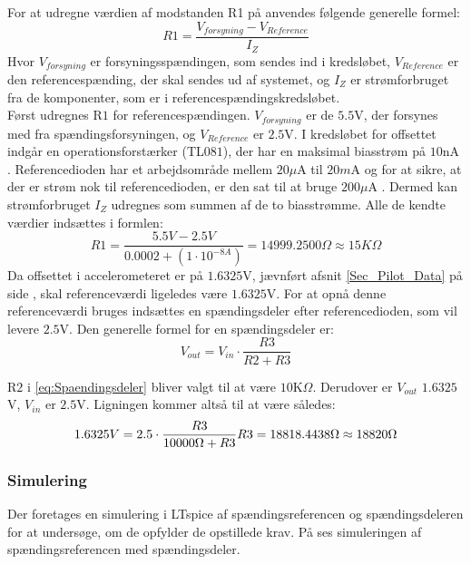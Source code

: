 \noindent For at udregne værdien af modstanden R1 på  anvendes følgende generelle formel:
\begin{equation}\label{eq:udregning_modstand}
R1 = \dfrac{V_{forsyning} - V_{Reference}}{I_{Z}}
\end{equation}
\noindent Hvor $V_{forsyning}$ er forsyningsspændingen, som sendes ind i kredsløbet, $V_{Reference}$ er den referencespænding, der skal sendes ud af systemet, og $I_{Z}$ er strømforbruget fra de komponenter, som er i referencespændingskredsløbet. \\
Først udregnes R$1$ for referencespændingen. $V_{forsyning}$ er de $5.5$V, der forsynes med fra spændingsforsyningen, og $V_{Reference}$ er $2.5$V. I kredsløbet for offsettet indgår en operationsforstærker (TL$081$), der har en maksimal biasstrøm på $10$nA \cite{Corporation1995}. Referencedioden har et arbejdsområde mellem $20\mu$A til $20m$A og for at sikre, at der er strøm nok til referencedioden, er den sat til at bruge $200\mu$A \cite{Instruments2005}. Dermed kan strømforbruget $I_{Z}$ udregnes som summen af de to biasstrømme. Alle de kendte værdier indsættes i formlen:
\begin{equation}
R1 = \frac{5.5V - 2.5V}{0.0002 + (1 \cdot 10^{-8A})} = 14999.2500\Omega \approx 15K\Omega
\end{equation}  
Da offsettet i accelerometeret er på $1.6325$V, jævnført afsnit \ref{Sec_Pilot_Data} på side \pageref{Sec_Pilot_Data}, skal referenceværdi ligeledes være $1.6325$V. For at opnå denne referenceværdi bruges indsættes en spændingsdeler efter referencedioden, som vil levere $2.5$V. Den generelle formel for en spændingsdeler er: 
\begin{equation} \label{eq:Spaendingsdeler}
V_{out} = V_{in} \cdot \dfrac{R3}{R2 + R3}
\end{equation}

R$2$ i \eqref{eq:Spaendingsdeler} bliver valgt til at være $10$K$\Omega$. Derudover er $V_{out}$ $1.6325$V, $V_{in}$ er $2.5$V. Ligningen kommer altså til at være således: 
\begin{equation}
1.6325V = 2.5 \cdot \dfrac{R3}{10000\Omega + R3} \\
R3 = 18818.4438\Omega \approx 18820\Omega
\end{equation}

\subsubsection{Simulering}
Der foretages en simulering i LTspice af spændingsreferencen og spændingsdeleren for at undersøge, om de opfylder de opstillede krav. På  ses simuleringen af spændingsreferencen med spændingsdeler. 

